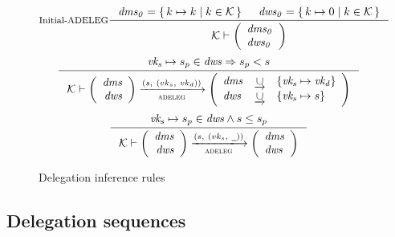 \begin{figure}[htb]
  \begin{equation}
    \inference[Initial-ADELEG]
    {
      \var{dms_0} = \Set{k \mapsto k}{k \in \mathcal{K}} &
      \var{dws_0} = \Set{k \mapsto 0}{k \in \mathcal{K}}
    }
    {
      \mathcal{K}
      \vdash
      \left(
        \begin{array}{l}
          \var{dms_0}\\
          \var{dws_0}
        \end{array}
      \right)
    }
  \end{equation}
  \nextdef
  \begin{equation}\label{eq:rule:delegation-change}
    \inference
    {\var{vk_s} \mapsto s_p \in \var{dws} \Rightarrow s_p < s
    }
    {
      \mathcal{K}
      \vdash
      \left(
      \begin{array}{r}
        \var{dms}\\
        \var{dws}
      \end{array}
      \right)
      \trans{adeleg}{(s,~ (vk_s,~ vk_d))}
      \left(
      \begin{array}{lcl}
        \var{dms} & \unionoverride & \{\var{vk_s} \mapsto \var{vk_d}\}\\
        \var{dws} & \unionoverride & \{\var{vk_s} \mapsto s \}
      \end{array}
      \right)
    }
  \end{equation}
  \nextdef
  \begin{equation}\label{eq:rule:delegation-nop}
    \inference
    {\var{vk_s} \mapsto s_p  \in \var{dws}  \wedge s \leq s_p
    }
    {
      \mathcal{K}
      \vdash
      \left(
      \begin{array}{r}
        \var{dms}\\
        \var{dws}
      \end{array}
      \right)
      \trans{adeleg}{(s,~ (vk_s,~ \wcard))}
      \left(
      \begin{array}{lcl}
        \var{dms}\\
        \var{dws}
      \end{array}
      \right)
    }
  \end{equation}
  \caption{Delegation inference rules}
  \label{fig:rules:delegation}
\end{figure}

\clearpage

\subsection{Delegation sequences}
\label{sec:delegation-sequences}

